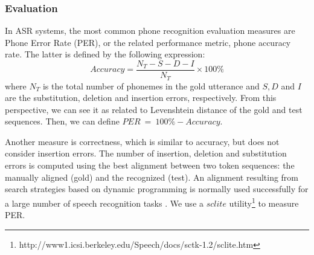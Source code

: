 \subsubsection{Evaluation}
\label{p-eval}
In ASR systems, the most common phone recognition evaluation measures are Phone Error Rate (PER), or the related performance metric, phone accuracy rate.
The latter is defined by the following expression:
\begin{equation}
Accuracy = \frac{N_T - S - D - I}{N_T} \times 100\%
\end{equation}
where $N_T$ is the total number of phonemes in the gold utterance and $S, D$ and $I$ are the substitution, deletion and insertion errors, respectively.
From this perspective, we can see it as related to Levenshtein distance of the gold and test sequences.
Then, we can define $PER \: = \: 100\% - Accuracy$.
\par
Another measure is correctness, which is similar to accuracy, but does not consider insertion errors.
The number of insertion, deletion and substitution errors is computed using the best alignment between two token sequences: the manually aligned (gold) and the recognized (test).
An alignment resulting from search strategies based on dynamic programming is normally used successfully for a large number of speech recognition tasks \cite{ney2000progress}.
We use a $sclite$ utility\footnote{http://www1.icsi.berkeley.edu/Speech/docs/sctk-1.2/sclite.htm} to measure PER.
